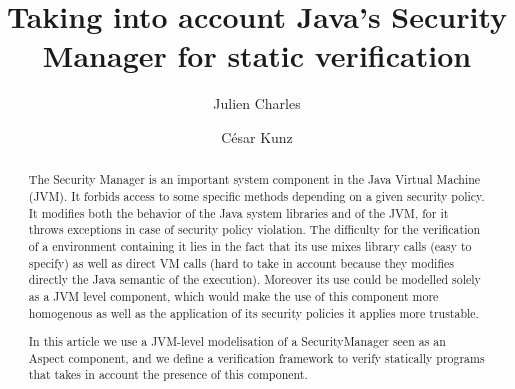 \documentclass[draft]{llncs}
\begin{document}
\newcommand{\rarrow}{$\rightarrow$}
\newcommand{\conj}{$\wedge$}
\newcommand{\disjonc}{$\vee$}
\newcommand{\s}{\,}
\newcommand{\btab}{\begin{tt}\begin{tabbing}}
\newcommand{\etab}{\end{tabbing}\end{tt}}
%
\frontmatter          %
%

\mainmatter              %
%
\title{Taking into account Java's Security Manager for static verification}
%
%
\author{Julien Charles \and C\'esar Kunz}
%
%
%

\maketitle              %

\begin{abstract}
The Security Manager is an important system component in the Java Virtual Machine (JVM). It forbids access
to some specific methods depending on a given security policy. It modifies both the behavior of 
the Java system libraries and of the JVM, for it throws exceptions in case of security policy 
violation.  The difficulty for the verification of a environment containing it 
lies in the fact that its use mixes library calls (easy to specify) as well as
direct VM calls (hard to take in account because they modifies directly the Java semantic of the execution). 
Moreover its use  could be modelled solely as a JVM level component, which would make the
use of this component more homogenous as well as the application of its security policies it applies 
more trustable.

In this article we use a JVM-level modelisation of a SecurityManager seen as an Aspect component, 
and we define a verification framework to verify statically programs that takes in account the presence 
of this component. 
\end{abstract}
%
\end{document}

